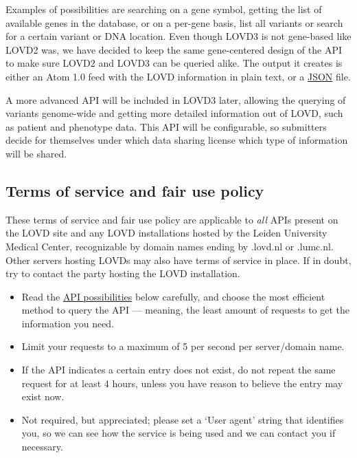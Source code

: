 Examples of possibilities are searching on a gene symbol, getting the list of available genes in the database,
 or on a per-gene basis, list all variants or search for a certain variant or DNA location.
Even though LOVD3 is not gene-based like LOVD2 was, we have decided to keep the same
 gene-centered design of the API to make sure LOVD2 and LOVD3 can be queried alike.
The output it creates is either an Atom 1.0 feed with the LOVD information in plain text, or a
 \href{http://www.json.org/}{JSON} file.

A more advanced API will be included in LOVD3 later, allowing the querying of variants genome-wide
 and getting more detailed information out of LOVD, such as patient and phenotype data.
This API will be configurable, so submitters decide for themselves under
 which data sharing license which type of information will be shared.



\subsection{Terms of service and fair use policy}
\begin{warntable}
  These terms of service and fair use policy are applicable to \emph{all} APIs present on the LOVD site
   and any LOVD installations hosted by the Leiden University Medical Center, recognizable by domain names ending
   by .lovd.nl or .lumc.nl.
  Other servers hosting LOVDs may also have terms of service in place.
  If in doubt, try to contact the party hosting the LOVD installation.
\end{warntable}

\begin{itemize}
  \item Read the \hyperlink{ssec:api_possibilities}{API possibilities} below carefully,
    and choose the most efficient method to query the API --- meaning,
    the least amount of requests to get the information you need.
  \item Limit your requests to a maximum of 5 per second per server/domain name.
  \item If the API indicates a certain entry does not exist, do not repeat the same request for at least 4 hours,
    unless you have reason to believe the entry may exist now.
  \item Not required, but appreciated; please set a `User agent' string that identifies you, so we can see how the
    service is being used and we can contact you if necessary.
\end{itemize}



